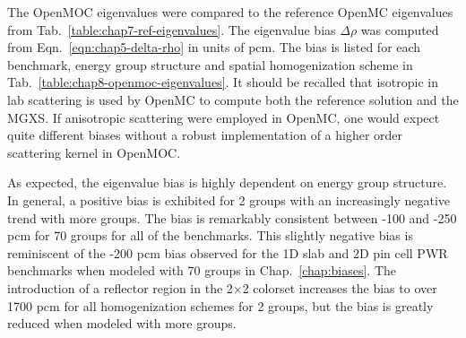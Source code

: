 The OpenMOC eigenvalues were compared to the reference OpenMC eigenvalues from Tab.~\ref{table:chap7-ref-eigenvalues}. The eigenvalue bias $\Delta\rho$ was computed from Eqn.~\ref{eqn:chap5-delta-rho} in units of \ac{pcm}. The bias is listed for each benchmark, energy group structure and spatial homogenization scheme in Tab.~\ref{table:chap8-openmoc-eigenvalues}. It should be recalled that isotropic in lab scattering is used by OpenMC to compute both the reference solution and the \ac{MGXS}. If anisotropic scattering were employed in OpenMC, one would expect quite different biases without a robust implementation of a higher order scattering kernel in OpenMOC.

As expected, the eigenvalue bias is highly dependent on energy group structure. In general, a positive bias is exhibited for 2 groups with an increasingly negative trend with more groups. The bias is remarkably consistent between -100 and -250 \ac{pcm} for 70 groups for all of the benchmarks. This slightly negative bias is reminiscent of the -200 \ac{pcm} bias observed for the 1D slab and 2D pin cell \ac{PWR} benchmarks when modeled with 70 groups in Chap.~\ref{chap:biases}. The introduction of a reflector region in the 2$\times$2 colorset increases the bias to over 1700 \ac{pcm} for all homogenization schemes for 2 groups, but the bias is greatly reduced when modeled with more groups.


\renewcommand{\arraystretch}{0.9}%

